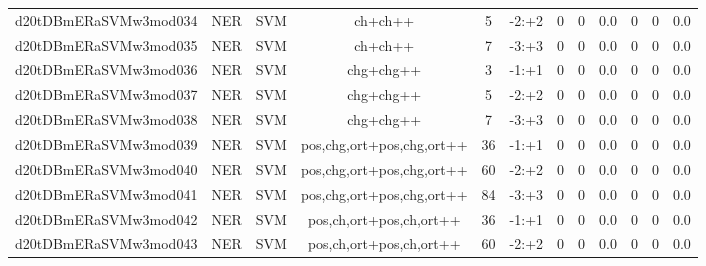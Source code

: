 \documentclass[a4paper]{article}
\begin{document}
\begin{landscape}
\begin{center}
\begin{tabular}{ |c|c|c|c|c|c|c|c|c|c|c|c|}
 
 	
 	\small{ d20tDBmERaSVMw3mod034 } & \small{ NER} & \small{  SVM }  & ch+ch++  &  5 &  \small{  -2:+2 }  &  0 & 0 & 0.0  &  0 & 0 & 0.0 \\
 	

 
 	
 	\small{ d20tDBmERaSVMw3mod035 } & \small{ NER} & \small{  SVM }  & ch+ch++  &  7 &  \small{  -3:+3 }  &  0 & 0 & 0.0  &  0 & 0 & 0.0 \\
 	

 
 	
 	\small{ d20tDBmERaSVMw3mod036 } & \small{ NER} & \small{  SVM }  & chg+chg++  &  3 &  \small{  -1:+1 }  &  0 & 0 & 0.0  &  0 & 0 & 0.0 \\
 	

 
 	
 	\small{ d20tDBmERaSVMw3mod037 } & \small{ NER} & \small{  SVM }  & chg+chg++  &  5 &  \small{  -2:+2 }  &  0 & 0 & 0.0  &  0 & 0 & 0.0 \\
 	

 
 	
 	\small{ d20tDBmERaSVMw3mod038 } & \small{ NER} & \small{  SVM }  & chg+chg++  &  7 &  \small{  -3:+3 }  &  0 & 0 & 0.0  &  0 & 0 & 0.0 \\
 	

 
 	
 	\small{ d20tDBmERaSVMw3mod039 } & \small{ NER} & \small{  SVM }  & pos,chg,ort+pos,chg,ort++  &  36 &  \small{  -1:+1 }  &  0 & 0 & 0.0  &  0 & 0 & 0.0 \\
 	

 
 	
 	\small{ d20tDBmERaSVMw3mod040 } & \small{ NER} & \small{  SVM }  & pos,chg,ort+pos,chg,ort++  &  60 &  \small{  -2:+2 }  &  0 & 0 & 0.0  &  0 & 0 & 0.0 \\
 	

 
 	
 	\small{ d20tDBmERaSVMw3mod041 } & \small{ NER} & \small{  SVM }  & pos,chg,ort+pos,chg,ort++  &  84 &  \small{  -3:+3 }  &  0 & 0 & 0.0  &  0 & 0 & 0.0 \\
 	

 
 	
 	\small{ d20tDBmERaSVMw3mod042 } & \small{ NER} & \small{  SVM }  & pos,ch,ort+pos,ch,ort++  &  36 &  \small{  -1:+1 }  &  0 & 0 & 0.0  &  0 & 0 & 0.0 \\
 	

 
 	
 	\small{ d20tDBmERaSVMw3mod043 } & \small{ NER} & \small{  SVM }  & pos,ch,ort+pos,ch,ort++  &  60 &  \small{  -2:+2 }  &  0 & 0 & 0.0  &  0 & 0 & 0.0 \\
 	


\end{tabular}
\end{center}
\end{landscape}
\end{document}

